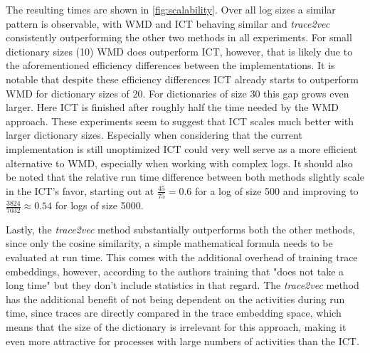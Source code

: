 \documentclass[runningheads]{template/llncs}
\begin{document}
The resulting times are shown in \cref{fig:scalability}.
Over all log sizes a similar pattern is observable, with WMD and ICT behaving similar and \emph{trace2vec} consistently outperforming the other two methods in all experiments.
For small dictionary sizes  (10) WMD does outperform ICT, however, that is likely due to the aforementioned efficiency differences between the implementations.
It is notable that despite these efficiency differences ICT already starts to outperform WMD for dictionary sizes of 20.
For dictionaries of size 30 this gap grows even larger.
Here ICT is finished after roughly half the time needed by the WMD approach.
These experiments seem to suggest that ICT scales much better with larger dictionary sizes.
Especially when considering that the current implementation is still unoptimized ICT could very well serve as a more efficient alternative to WMD, especially when working with complex logs.
It should also be noted that the relative run time difference between both methods slightly scale in the ICT's favor, starting out at $\frac{45}{75}=0.6$ for a log of size 500 and improving to $\frac{3824}{7032}\approx 0.54$ for logs of size 5000.

Lastly, the \emph{trace2vec} method substantially outperforms both the other methods, since only the cosine similarity, a simple mathematical formula needs to be evaluated at run time.
This comes with the additional overhead of training trace embeddings, however, according to the authors training that "does not take a long time" but they don't include statistics in that regard.
The \emph{trace2vec} method has the additional benefit of not being dependent on the activities during run time, since traces are directly compared in the trace embedding space, which means that the size of the dictionary is irrelevant for this approach, making it even more attractive for processes with large numbers of activities than the ICT.
\end{document}
